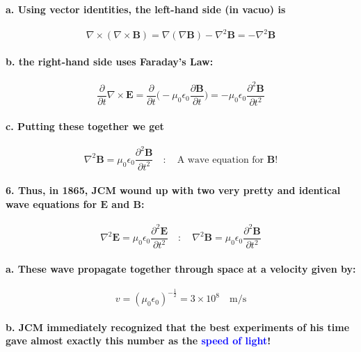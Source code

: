 \documentclass{article}
\begin{document}
\paragraph{\indent a. Using vector identities, the left-hand side (in vacuo) is}
\begin{equation*}
    \nabla\times(\nabla\times\boldsymbol{B})=\nabla(\nabla\boldsymbol{B})-\nabla^2\boldsymbol{B}=-\nabla^2\boldsymbol{B}
\end{equation*}
\paragraph{\indent b. the right-hand side uses Faraday's Law:}
\begin{equation*}
    \frac{\partial}{\partial t}\nabla\times\boldsymbol{E}=\frac{\partial}{\partial t}\bigg( -\mu_0\epsilon_0\frac{\partial\boldsymbol{B}}{\partial t}\bigg)=-\mu_0\epsilon_0\frac{\partial^2\boldsymbol{B}}{\partial t^2}
\end{equation*}
\paragraph{\indent c. Putting these together we get}
\begin{equation*}
    \nabla^2\boldsymbol{B}=\mu_0\epsilon_0\frac{\partial^2\boldsymbol{B}}{\partial t^2}\quad:\quad\text{A wave equation for $\boldsymbol{B}$!}
\end{equation*}
\paragraph{6. Thus, in 1865, JCM wound up with two very pretty and identical wave equations for $\boldsymbol{E}$ and $\boldsymbol{B}$:}
\begin{equation*}
    \nabla^2\boldsymbol{E}=\mu_0\epsilon_0\frac{\partial^2\boldsymbol{E}}{\partial t^2}\quad:\quad\nabla^2\boldsymbol{B}=\mu_0\epsilon_0\frac{\partial^2\boldsymbol{B}}{\partial t^2}
\end{equation*}
\paragraph{\indent a. These wave propagate together through space at a velocity given by:}
\begin{equation*}
    v=(\mu_0\epsilon_0)^{-\frac{1}{2}}=3\times10^8 \quad \text{m/s}
\end{equation*}
\paragraph{\indent b. JCM immediately recognized that the best experiments of his time gave almost exactly this number as the \textcolor{blue}{speed of light}!}
\end{document}

